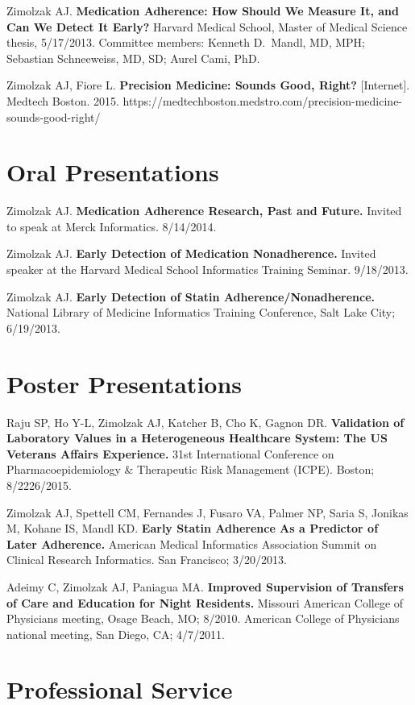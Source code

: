 \documentclass[12pt]{article}
\begin{document}
Zimolzak AJ. \textbf{Medication Adherence: How Should We Measure It,
  and Can We Detect It Early?} Harvard Medical School, Master of
Medical Science thesis, 5/17/2013. Committee members: Kenneth
D.\ Mandl, MD, MPH; Sebastian Schneeweiss, MD, SD; Aurel Cami, PhD.

Zimolzak AJ, Fiore L. \textbf{Precision Medicine: Sounds Good, Right?}
[Internet]. Medtech Boston. 2015. 
https://medtechboston.medstro.com/precision-medicine-sounds-good-right/

\section*{Oral Presentations} %

Zimolzak AJ. \textbf{Medication Adherence Research, Past and Future.}
Invited to speak at Merck Informatics. 8/14/2014.

Zimolzak AJ. \textbf{Early Detection of Medication Nonadherence.}
Invited speaker at the Harvard Medical School Informatics Training
Seminar. 9/18/2013.

Zimolzak AJ. \textbf{Early Detection of Statin
  Adherence/Nonadherence.} National Library of Medicine Informatics
Training Conference, Salt Lake City; 6/19/2013.

\section*{Poster Presentations}

Raju SP, Ho Y-L, Zimolzak AJ, Katcher B, Cho K, Gagnon DR.
\textbf{Validation of Laboratory Values in a Heterogeneous Healthcare
  System: The US Veterans Affairs Experience.} 31st International
Conference on Pharmacoepidemiology \& Therapeutic Risk Management
(ICPE). Boston; 8/22\ndash{}26/2015.

Zimolzak AJ, Spettell CM, Fernandes J, Fusaro VA, Palmer NP, Saria S,
Jonikas M, Kohane IS, Mandl KD. \textbf{Early Statin Adherence As a
  Predictor of Later Adherence.} American Medical Informatics
Association Summit on Clinical Research Informatics. San Francisco;
3/20/2013.

Adeimy C, Zimolzak AJ, Paniagua MA. \textbf{Improved Supervision of
  Transfers of Care and Education for Night Residents.} Missouri
American College of Physicians meeting, Osage Beach, MO; 8/2010.
American College of Physicians national meeting, San Diego, CA;
4/7/2011.

\section*{Professional Service}
\end{document}
